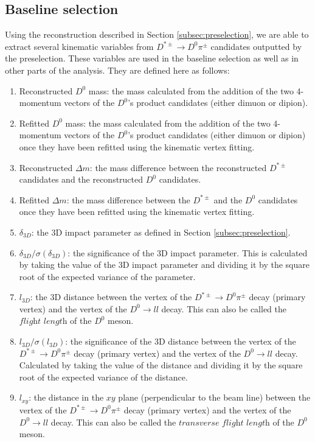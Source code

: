 \subsection{Baseline selection}
\label{subsec:baseline_selection}

Using the reconstruction described in Section \ref{subsec:preselection}, we are able to extract several kinematic variables from $D^{*\pm} \to D^0 \pi^\pm$ candidates outputted by the preselection. These variables are used in the baseline selection as well as in other parts of the analysis. They are defined here as follows:
\begin{enumerate}
    \item Reconstructed $D^0$ mass: the mass calculated from the addition of the two 4-momentum vectors of the $D^0$'s product candidates (either dimuon or dipion). 
    \item Refitted $D^0$ mass: the mass calculated from the addition of the two 4-momentum vectors of the $D^0$'s product candidates (either dimuon or dipion) once they have been refitted using the kinematic vertex fitting. 
    \item Reconstructed $\Delta m$: the mass difference between the reconstructed $D^{*\pm}$ candidates and the reconstructed $D^0$ candidates. 
    \item Refitted $\Delta m$: the mass difference between the $D^{*\pm}$ and the $D^0$ candidates once they have been refitted using the kinematic vertex fitting.
    \item $\delta_{3D}$: the 3D impact parameter as defined in Section \ref{subsec:preselection}.
    \item $\delta_{3D}/\sigma\left(\delta_{3D}\right)$: the significance of the 3D impact parameter. This is calculated by taking the value of the 3D impact parameter and dividing it by the square root of the expected variance of the parameter. 
    \item $l_{3D}$: the 3D distance between the vertex of the $D^{*\pm} \to D^0 \pi^\pm$ decay (primary vertex) and the vertex of the $D^0 \to l l$ decay. This can also be called the $\textit{flight length}$ of the $D^0$ meson. 
    \item $l_{3D}/\sigma\left(l_{3D}\right)$: the significance of the 3D distance between the vertex of the $D^{*\pm} \to D^0 \pi^\pm$ decay (primary vertex) and the vertex of the $D^0 \to l l$ decay. Calculated by taking the value of the distance and dividing it by the square root of the expected variance of the distance. 
    \item $l_{xy}$: the distance in the $xy$ plane (perpendicular to the beam line) between the vertex of the $D^{*\pm} \to D^0 \pi^\pm$ decay (primary vertex) and the vertex of the $D^0 \to l l$ decay.  This can also be called the $\textit{transverse flight length}$ of the $D^0$ meson. 

\end{enumerate}
